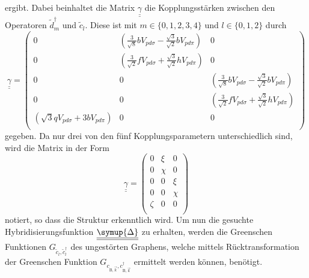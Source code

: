 ergibt.
Dabei beinhaltet die Matrix $\underline{\underline{\gamma}}$ die Kopplungsstärken zwischen den Operatoren $\tilde{d}_m^\dagger$ und $\tilde{c}_l$.
Diese ist mit $m \in \{ 0,1,2,3,4 \}$ und $l \in \{ 0,1,2 \}$ durch
\begin{equation*}
     \underline{\underline{\gamma}} = 
    \begin{pmatrix}
        0               & \left ( \frac{3}{\sqrt{8}} b V_{pd\sigma} - \frac{\sqrt{3}}{\sqrt{2}}  b   V_{pd\pi} \right )    &   0           \\
        0               & \left ( \frac{3}{\sqrt{2}} f V_{pd\sigma} + \frac{\sqrt{3}}{\sqrt{2}}  h   V_{pd\pi} \right )   &   0           \\
        0               & 0             &   \left ( \frac{3}{\sqrt{8}} b V_{pd\sigma} - \frac{\sqrt{3}}{\sqrt{2}}  b   V_{pd\pi} \right ) \\
        0               & 0             &   \left ( \frac{3}{\sqrt{2}} f V_{pd\sigma} + \frac{\sqrt{3}}{\sqrt{2}}  h   V_{pd\pi} \right ) \\
        \left (  \sqrt{3} q V_{pd\sigma} + 3 b V_{pd\pi} \right )     & 0             &   0           \\
    \end{pmatrix}
\end{equation*} 
gegeben.
Da nur drei von den fünf Kopplungsparametern unterschiedlich sind, wird die Matrix in der Form  
\begin{equation}
    \underline{\underline{\gamma}} = 
   \begin{pmatrix}
       0               & \xi    &   0           \\
       0               & \chi   &   0           \\
       0               & 0             &   \xi \\
       0               & 0             &   \chi \\
       \zeta     & 0             &   0           \\
   \end{pmatrix} \label{eqn:gammakopcrazy}
\end{equation} 
notiert, so dass die Struktur erkenntlich wird.
Um nun die gesuchte Hybridisierungsfunktion $\underline{\underline{\symup{\Delta}}}$ zu erhalten, werden die Greenschen Funktionen
$G_{\tilde{c}_l, \tilde{c}_l^{\dagger}}$ des ungestörten Graphens, welche mittels Rücktransformation der Greenschen Funktion 
$G_{c_{\text{B}, \vec{k}}, c_{\text{B}, \vec{k}}^\dagger}$ ermittelt werden können, benötigt.
